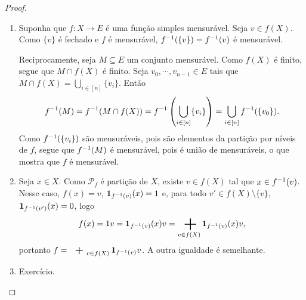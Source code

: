 \begin{proof}
	\begin{enumerate}
	\item Suponha que $f\colon X \to E$ é uma função simples mensurável. Seja $v \in f(X)$. Como $\{v\}$ é fechado e $f$ é mensurável, $f^{-1}(\{v\})=f^{-1}(v)$ é mensurável.

Reciprocamente, seja $M \subseteq E$ um conjunto mensurável. Como $f(X)$ é finito, segue que $M \cap f(X)$ é finito. Seja $v_0, \cdots,v_{n-1} \in E$ tais que $M \cap f(X) = \bigcup_{i \in [n]} \{v_i\}$. Então
		\begin{equation*}
		f^{-1}(M) = f^{-1}(M \cap f(X)) = f^{-1} \left( \bigcup_{i \in [n]} \{v_i\} \right) = \bigcup_{i \in [n]} f^{-1}(\{v_0\}).
		\end{equation*}
Como $f^{-1}(\{v_i\})$ são mensuráveis, pois são elementos da partição por níveis de $f$, segue que $f^{-1}(M)$ é mensurável, pois é união de mensuráveis, o que mostra que $f$ é mensurável.
	
	\item Seja $x \in X$. Como $\mathcal P_f$ é partição de $X$, existe $v \in f(X)$ tal que $x \in f^{-1}(v)$. Nesse caso, $f(x)=v$, ${\bm 1}_{f^{-1}(v)}(x)=1$ e, para todo $v' \in f(X) \setminus \{v\}$, ${\bm 1}_{f^{-1}(v')}(x)=0$, logo
		\begin{equation*}
		f(x) = 1v = \idc_{f\inv(v)}(x) v = \sum_{v \in f(X)} \idc_{f\inv(v)}(x) v,
		\end{equation*}
portanto $f=\sum_{v \in f(X)} \idc_{f\inv(v)} v$.
A outra igualdade é semelhante.
	
	\item Exercício.
	\end{enumerate}
\end{proof}

